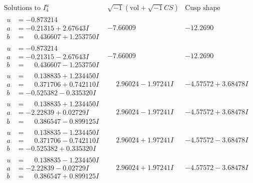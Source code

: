 \documentclass[1p]{elsarticle_modified}
\theoremstyle{definition}
\newcommand{\I}{\sqrt{-1}}
\begin{document}
$$\begin{array}{c|c|c}  
\text{Solutions to }I^u_{4}& \I (\text{vol} + \sqrt{-1}CS) & \text{Cusp shape}\\
 \hline 
\begin{aligned}
u &= -0.873214\phantom{ +0.000000I} \\
a &= -0.21315 + 2.67643 I \\
b &= \phantom{-}0.436607 + 1.253750 I\end{aligned}
 & -7.66009\phantom{ +0.000000I} & -12.2690\phantom{ +0.000000I} \\ \hline\begin{aligned}
u &= -0.873214\phantom{ +0.000000I} \\
a &= -0.21315 - 2.67643 I \\
b &= \phantom{-}0.436607 - 1.253750 I\end{aligned}
 & -7.66009\phantom{ +0.000000I} & -12.2690\phantom{ +0.000000I} \\ \hline\begin{aligned}
u &= \phantom{-}0.138835 + 1.234450 I \\
a &= \phantom{-}0.371706 + 0.742110 I \\
b &= -0.525382 - 0.335320 I\end{aligned}
 & \phantom{-}2.96024 - 1.97241 I & -4.57572 + 3.68478 I \\ \hline\begin{aligned}
u &= \phantom{-}0.138835 + 1.234450 I \\
a &= -2.22839 + 0.02729 I \\
b &= \phantom{-}0.386547 - 0.899125 I\end{aligned}
 & \phantom{-}2.96024 - 1.97241 I & -4.57572 + 3.68478 I \\ \hline\begin{aligned}
u &= \phantom{-}0.138835 - 1.234450 I \\
a &= \phantom{-}0.371706 - 0.742110 I \\
b &= -0.525382 + 0.335320 I\end{aligned}
 & \phantom{-}2.96024 + 1.97241 I & -4.57572 - 3.68478 I \\ \hline\begin{aligned}
u &= \phantom{-}0.138835 - 1.234450 I \\
a &= -2.22839 - 0.02729 I \\
b &= \phantom{-}0.386547 + 0.899125 I\end{aligned}
 & \phantom{-}2.96024 + 1.97241 I & -4.57572 - 3.68478 I \\ \hline\begin{aligned}

\end{aligned}
\end{array}$$
\end{document}
